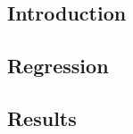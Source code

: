 \documentclass[svgnames,smaller]{beamer}
\begin{document}
	\subsection{Introduction}
		
	
	\subsection{Regression}
		


	\subsection{Results}
		
		
			

		

		
\end{document}
